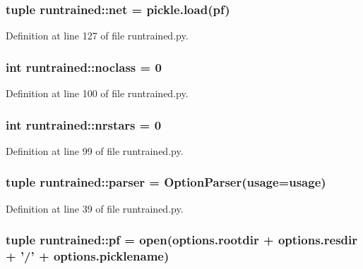 \hypertarget{namespaceruntrained_a5c8cf741c34dad8832215a3523e21ee1}{
\subsubsection[{net}]{\setlength{\rightskip}{0pt plus 5cm}tuple {\bf runtrained::net} = pickle.load({\bf pf})}}
\label{namespaceruntrained_a5c8cf741c34dad8832215a3523e21ee1}


Definition at line 127 of file runtrained.py.

\hypertarget{namespaceruntrained_ae20d562b30bfd0ee3392b557c477b792}{
\subsubsection[{noclass}]{\setlength{\rightskip}{0pt plus 5cm}int {\bf runtrained::noclass} = 0}}
\label{namespaceruntrained_ae20d562b30bfd0ee3392b557c477b792}


Definition at line 100 of file runtrained.py.

\hypertarget{namespaceruntrained_a5aa5eb79d3fc0906fd344c0b3537bdc6}{
\subsubsection[{nrstars}]{\setlength{\rightskip}{0pt plus 5cm}int {\bf runtrained::nrstars} = 0}}
\label{namespaceruntrained_a5aa5eb79d3fc0906fd344c0b3537bdc6}


Definition at line 99 of file runtrained.py.

\hypertarget{namespaceruntrained_a965f57e18609caa1e9410347cae7af38}{
\subsubsection[{parser}]{\setlength{\rightskip}{0pt plus 5cm}tuple {\bf runtrained::parser} = OptionParser({\bf usage}={\bf usage})}}
\label{namespaceruntrained_a965f57e18609caa1e9410347cae7af38}


Definition at line 39 of file runtrained.py.

\hypertarget{namespaceruntrained_a2ff49f98ec84b551c2023c8e83115825}{
\subsubsection[{pf}]{\setlength{\rightskip}{0pt plus 5cm}tuple {\bf runtrained::pf} = open(options.rootdir + options.resdir + '/' + options.picklename)}}
\label{namespaceruntrained_a2ff49f98ec84b551c2023c8e83115825}


